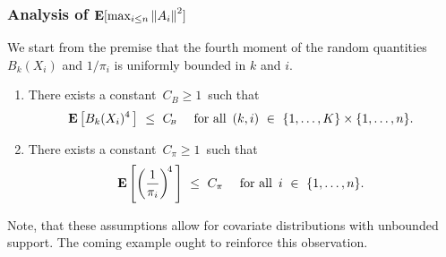 \subsubsection*{
  Analysis of 
  $
  \mathbf{E}[\max_{i \le n}\left\lVert A_i\right\rVert^2]
  $
}
We start from the premise that the fourth moment of 
the random quantities $B_k(X_i)$ and $1/\pi_i$ is uniformly bounded 
in $k$ and $i$.
\begin{assumptions*}
  \begin{enumerate}[label={(\roman*)}]
    \item
  There exists 
  a constant 
  $
  \,
    C_{\!\scriptscriptstyle B}
  \ge
  1
  \,
  $ such that
  \begin{gather*}
  \E\left[
    B_k(X_i)^{4}
    \,
  \right]
  \ 
  \le
  \ 
    C_{\!\scriptscriptstyle B}
    \quad
    \text{
  for all $\,(k,i)\ \in\  \left\{ 1, \ldots, K \right\}\times \left\{ 1, \ldots, n \right\}$.
    }
  \end{gather*}
  \item
  There exists a constant $\,C_\pi \!\ge 1\,$ such that
  \begin{gather*}
  \E \left[ 
    \left(
      \frac{1}{\pi_{i}}
    \right)^{\!4}
    \,
  \right]
  \ 
  \le
  \ 
  C_\pi
  \quad
  \text{
  for all $\,i\ \in\  \left\{ 1, \ldots, n \right\}$.
  }
  \end{gather*}
  \end{enumerate}
\end{assumptions*}
Note, that these assumptions allow for covariate distributions with unbounded support. The coming example ought to reinforce this observation.

